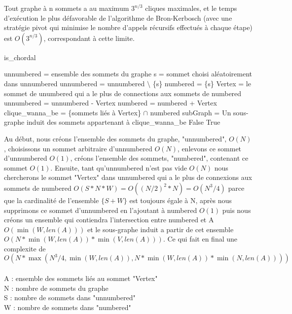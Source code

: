 \documentclass{article}
\begin{document}
\cite{Algo1} Tout graphe à n sommets a au maximum $3^{n/3}$ cliques maximales, et le temps d'exécution le plus défavorable de l'algorithme de Bron-Kerbosch (avec une stratégie pivot qui minimise le nombre d'appels récursifs effectués à chaque étape) est $O(3^{n/3})$, correspondant à cette limite.


		\begin{algorithm}[H]
		\caption{is\_chordal}
		\begin{algorithmic}[1]		
		
		\STATE unnumbered = ensemble des sommets du graphe
		\STATE s = sommet choisi aléatoirement dans unnumbered
		\STATE unnumbered = unnumbered $\setminus$ \{s\}
		\STATE numbered  = \{s\}
			\STATE Vertex = le sommet de unumbered qui a le plus de connections aux sommets de numbered
			\STATE unnumbered = unnumbered - Vertex
			\STATE numbered = numbered + Vertex
			\STATE clique\_wanna\_be = \{sommets liés à Vertex\} $\cap$ numbered
			\STATE subGraph	= Un sous-graphe induit des sommets appartenant à clique\_wanna\_be
				\RETURN False
			\ENDIF
		\ENDWHILE
		\RETURN True
		\end{algorithmic}
		\end{algorithm}

\cite{Algo2} Au début, nous créons l'ensemble des sommets du graphe, "unnumbered", $O(N)$, choisissons un sommet 
arbitraire d'unnumbered $O(N)$, enlevons ce sommet d'unnumbered $O(1)$,
créons l'ensemble des sommets, "numbered", contenant ce sommet $O(1)$.
Ensuite, tant qu'unnumbered n'est pas vide $O(N)$ nous chercherons
le sommet "Vertex" dans unnumbered qui a le plus de connexions aux sommets 
de numbered $O(S * N * W) = O((N/2)^2*N) = O(N^3/4)$ parce que la cardinalité 
de l'ensemble $\{S+W\}$ est toujours égale à N, après nous supprimons ce sommet d'unnumbered en 
l'ajoutant à numbered $O(1)$ puis nous créons un ensemble qui contiendra 
l'intersection entre numbered et A $O(\min(W,len(A)))$ et le 
sous-graphe induit a partir de cet ensemble $O(N*\min(W,len(A))*\min(V,len(A)))$.
Ce qui fait en final une complexite de
$O(N*\max(N^3/4,\min(W,len(A)),N*\min(W,len(A))*\min(N,len(A))))$\\\\
\noindent
A : ensemble des sommets liés au sommet "Vertex"\\
N : nombre de sommets du graphe\\
S : nombre de sommets dans "unnumbered"\\
W : nombre de sommets dans "numbered"
		
\end{document}
